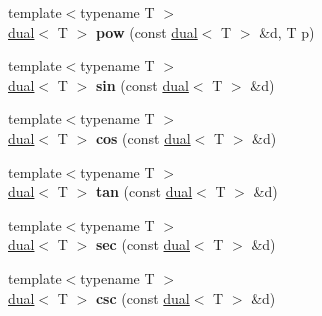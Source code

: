 \begin{DoxyCompactItemize}
\item 
\hypertarget{namespace_d_r_d_s_p_a0e9da5dabdf9cab3f150f189d93f93a6}{{\footnotesize template$<$typename T $>$ }\\\hyperlink{struct_d_r_d_s_p_1_1dual}{dual}$<$ T $>$ {\bfseries pow} (const \hyperlink{struct_d_r_d_s_p_1_1dual}{dual}$<$ T $>$ \&d, T p)}\label{namespace_d_r_d_s_p_a0e9da5dabdf9cab3f150f189d93f93a6}

\item 
\hypertarget{namespace_d_r_d_s_p_a1deafac738dc73b02a6f335b637b749c}{{\footnotesize template$<$typename T $>$ }\\\hyperlink{struct_d_r_d_s_p_1_1dual}{dual}$<$ T $>$ {\bfseries sin} (const \hyperlink{struct_d_r_d_s_p_1_1dual}{dual}$<$ T $>$ \&d)}\label{namespace_d_r_d_s_p_a1deafac738dc73b02a6f335b637b749c}

\item 
\hypertarget{namespace_d_r_d_s_p_a702ab33d935b31b3f89a9d22c225b76d}{{\footnotesize template$<$typename T $>$ }\\\hyperlink{struct_d_r_d_s_p_1_1dual}{dual}$<$ T $>$ {\bfseries cos} (const \hyperlink{struct_d_r_d_s_p_1_1dual}{dual}$<$ T $>$ \&d)}\label{namespace_d_r_d_s_p_a702ab33d935b31b3f89a9d22c225b76d}

\item 
\hypertarget{namespace_d_r_d_s_p_a903badd2bf2f5c2985dce04e9c520f2d}{{\footnotesize template$<$typename T $>$ }\\\hyperlink{struct_d_r_d_s_p_1_1dual}{dual}$<$ T $>$ {\bfseries tan} (const \hyperlink{struct_d_r_d_s_p_1_1dual}{dual}$<$ T $>$ \&d)}\label{namespace_d_r_d_s_p_a903badd2bf2f5c2985dce04e9c520f2d}

\item 
\hypertarget{namespace_d_r_d_s_p_a383bb801e23a931321c789ff4157d723}{{\footnotesize template$<$typename T $>$ }\\\hyperlink{struct_d_r_d_s_p_1_1dual}{dual}$<$ T $>$ {\bfseries sec} (const \hyperlink{struct_d_r_d_s_p_1_1dual}{dual}$<$ T $>$ \&d)}\label{namespace_d_r_d_s_p_a383bb801e23a931321c789ff4157d723}

\item 
\hypertarget{namespace_d_r_d_s_p_a8eaaf73ab84dcb6f2610c68712c70a29}{{\footnotesize template$<$typename T $>$ }\\\hyperlink{struct_d_r_d_s_p_1_1dual}{dual}$<$ T $>$ {\bfseries csc} (const \hyperlink{struct_d_r_d_s_p_1_1dual}{dual}$<$ T $>$ \&d)}\label{namespace_d_r_d_s_p_a8eaaf73ab84dcb6f2610c68712c70a29}


\end{DoxyCompactItemize}
